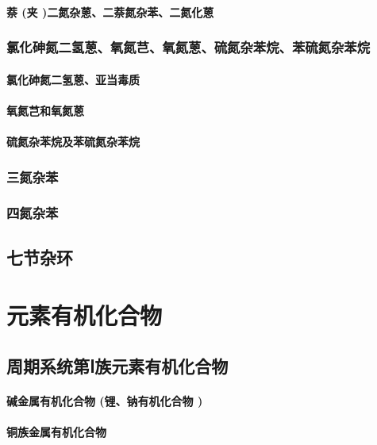 \documentclass[UTF8]{../03-Chemistry}
\begin{document}
        \subsubsection{萘 (夹 )二氮杂蒽、二萘氮杂苯、二氮化蒽}
    \subsection{氯化砷氮二氢蒽、氧氮芑、氧氮蒽、硫氮杂苯烷、苯硫氮杂苯烷}
        \subsubsection{氯化砷氮二氢蒽、亚当毒质}
        \subsubsection{氧氮芑和氧氮蒽}
        \subsubsection{硫氮杂苯烷及苯硫氮杂苯烷}
    \subsection{三氮杂苯}
    \subsection{四氮杂苯}
\section{七节杂环}









\chapter{元素有机化合物}

\section{周期系统第Ⅰ族元素有机化合物}
    \subsubsection{碱金属有机化合物 (锂、钠有机化合物 )}
    \subsubsection{铜族金属有机化合物}
\end{document}
